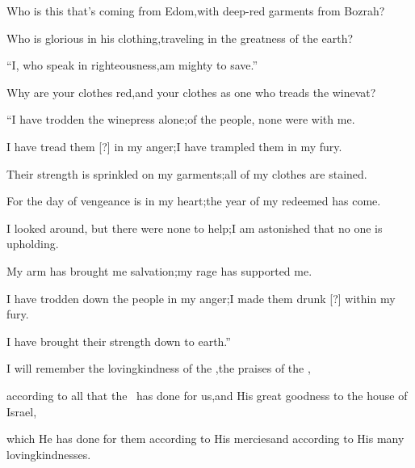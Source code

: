 
\begin{inparaenum}
  \pb{} Who is this that's coming from Edom,\pa{}with deep-red garments from Bozrah?%

  \pb{}Who is glorious in his clothing,\pa{}traveling in the greatness of the earth?%

  \pb{}``I, who speak in righteousness,\pa{}am mighty to save.''%

  \pb{} Why are your clothes red,\pa{}and your clothes as one who treads the winevat?%

  \pb{} ``I have trodden the winepress alone;\pa{}of the people, none were with me.%

  \pc{}I have tread them [?] in my anger;\pa{}I have trampled them in my fury.%

  \pc{}Their strength is sprinkled on my garments;\pa{}all of my clothes are stained.%

  \pb{} For the day of vengeance is in my heart;\pa{}the year of my redeemed has come.%

  \pb{} I looked around, but there were none to help;\pa{}I am astonished that no one is upholding.%

  \pc{}My arm has brought me salvation;\pa{}my rage has supported me.%

  \pb{} I have trodden down the people in my anger;\pa{}I made them drunk [?] within my fury.%

  \pc{}I have brought their strength%
  down to earth.''%

  \pa{} I will remember the lovingkindness of the \lord,\pa{}the praises of the \lord,%

  \pb{}according to all that the \lord\ has done for us,\pa{}and His great goodness to the house of Israel,%

  \pb{}which He has done for them according to His mercies\pa{}and according to His many lovingkindnesses.%


\end{inparaenum}

